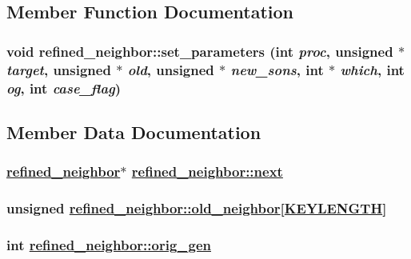 \subsection{Member Function Documentation}
\hypertarget{structrefined__neighbor_a1}{
\subsubsection[set\_\-parameters]{\setlength{\rightskip}{0pt plus 5cm}void refined\_\-neighbor::set\_\-parameters (int {\em proc}, unsigned $\ast$ {\em target}, unsigned $\ast$ {\em old}, unsigned $\ast$ {\em new\_\-sons}, int $\ast$ {\em which}, int {\em og}, int {\em case\_\-flag})}}
\label{structrefined__neighbor_a1}




\subsection{Member Data Documentation}
\hypertarget{structrefined__neighbor_o5}{
\subsubsection[next]{\setlength{\rightskip}{0pt plus 5cm}\hyperlink{structrefined__neighbor}{refined\_\-neighbor}$\ast$ \hyperlink{structrefined__neighbor_o5}{refined\_\-neighbor::next}}}
\label{structrefined__neighbor_o5}


\hypertarget{structrefined__neighbor_o3}{
\subsubsection[old\_\-neighbor]{\setlength{\rightskip}{0pt plus 5cm}unsigned \hyperlink{structrefined__neighbor_o3}{refined\_\-neighbor::old\_\-neighbor}\mbox{[}\hyperlink{constant_8h_a10}{KEYLENGTH}\mbox{]}}}
\label{structrefined__neighbor_o3}


\hypertarget{structrefined__neighbor_o1}{
\subsubsection[orig\_\-gen]{\setlength{\rightskip}{0pt plus 5cm}int \hyperlink{structrefined__neighbor_o1}{refined\_\-neighbor::orig\_\-gen}}}
\label{structrefined__neighbor_o1}



